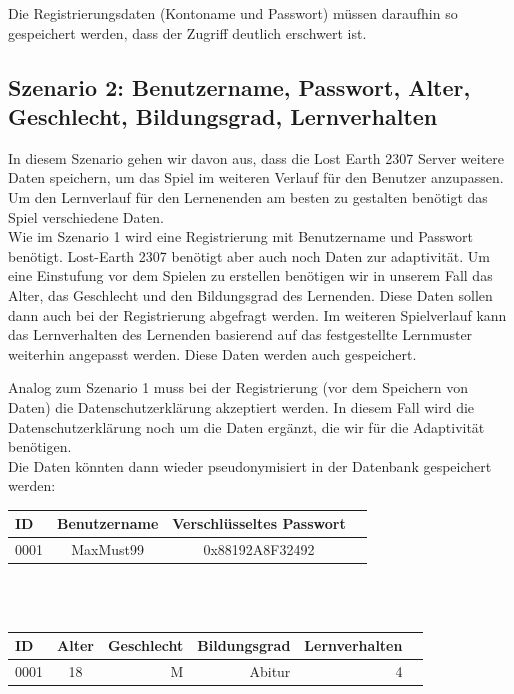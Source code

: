 \documentclass[a4paper, 12pt]{article}
\begin{document}
\noindent Die Registrierungsdaten (Kontoname und Passwort) müssen daraufhin so gespeichert werden, dass der Zugriff deutlich erschwert ist. 
\subsection{Szenario 2: Benutzername, Passwort, Alter, Geschlecht, Bildungsgrad, Lernverhalten}

In diesem Szenario gehen wir davon aus, dass die Lost Earth 2307 Server weitere Daten speichern, um das Spiel im weiteren Verlauf für den Benutzer anzupassen. Um den Lernverlauf für den Lernenenden am besten zu gestalten benötigt das Spiel verschiedene Daten.\\

\noindent Wie im Szenario 1 wird eine Registrierung mit Benutzername und Passwort benötigt. Lost-Earth 2307 benötigt aber auch noch Daten zur adaptivität. Um eine Einstufung vor dem Spielen zu erstellen benötigen wir in unserem Fall das Alter, das Geschlecht und den Bildungsgrad des Lernenden. Diese Daten sollen dann  auch bei der Registrierung abgefragt werden. 
Im weiteren Spielverlauf kann das Lernverhalten des Lernenden basierend auf das festgestellte Lernmuster weiterhin angepasst werden. Diese Daten werden auch gespeichert.

\noindent Analog zum Szenario 1 muss bei der Registrierung (vor dem Speichern von Daten) die Datenschutzerklärung akzeptiert werden. In diesem Fall wird die Datenschutzerklärung noch um die Daten ergänzt, die wir für die Adaptivität benötigen.\\

Die Daten könnten dann wieder pseudonymisiert in der Datenbank gespeichert werden:\\

\begin{tabular}{lccc}
	
	ID & Benutzername & Verschlüsseltes Passwort\\
	\hline
	0001 & MaxMust99 & 0x88192A8F32492
	
\end{tabular}\\\\


\begin{tabular}{lcrrrr}
	
	ID & Alter & Geschlecht & Bildungsgrad & Lernverhalten\\
	\hline
	0001 & 18 & M & Abitur & 4
	
\end{tabular}
\end{document}
